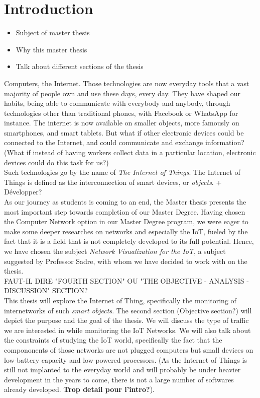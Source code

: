 \section{Introduction}

\begin{itemize}
	\item Subject of master thesis
	\item Why this master thesis
	\item Talk about different sections of the thesis
\end{itemize}

Computers, the Internet. Those technologies are now everyday tools that a vast majority of people own and use these days, every day. They have shaped our habits, being able to communicate with everybody and anybody, through technologies other than traditional phones, with Facebook or WhatsApp for instance. The internet is now available on smaller objects, more famously on smartphones, and smart tablets. But what if other electronic devices could be connected to the Internet, and could communicate and exchange information? (What if instead of having workers collect data in a particular location, electronic devices could do this task for us?)\\

Such technologies go by the name of \textit{The Internet of Things}. The Internet of Things is defined as the interconnection of smart devices, or \textit{objects}. + Développer? \\

As our journey as students is coming to an end, the Master thesis presents the most important step towards completion of our Master Degree.  Having chosen the Computer Network option in our Master Degree program, we were eager to make some deeper researches on networks and especially the IoT, fueled by the fact that it is a field that is not completely developed to its full potential. Hence, we have chosen the subject \textit{Network Visualization for the IoT}, a subject suggested by Professor Sadre, with whom we have decided to work with on the thesis. \\

FAUT-IL DIRE "FOURTH SECTION" OU "THE OBJECTIVE - ANALYSIS - DISCUSSION" SECTION? \\

This thesis will explore the Internet of Thing, specifically the monitoring of internetworks of such \textit{smart objects}. The second section (Objective section?) will depict the purpose and the goal of the thesis. We will discuss the type of traffic we are interested in while monitoring the IoT Networks. We will also talk about the constraints of studying the IoT world, specifically the fact that the compononents of those networks are not plugged computers but small devices on low-battery capacity and low-powered processors. (As the Internet of Things is still not implanted to the everyday world and will probably be under heavier development in the years to come, there is not a large number of softwares already developed. \textbf{Trop detail pour l'intro?}).\\


